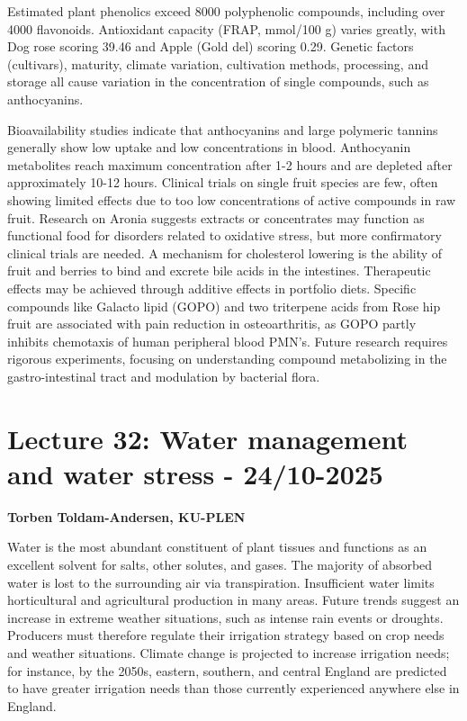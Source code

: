 \vspace{0.5em}
Estimated plant phenolics exceed 8000 polyphenolic compounds, including over 4000 flavonoids. Antioxidant capacity (FRAP, mmol/100 g) varies greatly, with Dog rose scoring 39.46 and Apple (Gold del) scoring 0.29. Genetic factors (cultivars), maturity, climate variation, cultivation methods, processing, and storage all cause variation in the concentration of single compounds, such as anthocyanins.

\vspace{0.5em}
Bioavailability studies indicate that anthocyanins and large polymeric tannins generally show low uptake and low concentrations in blood. Anthocyanin metabolites reach maximum concentration after 1-2 hours and are depleted after approximately 10-12 hours. Clinical trials on single fruit species are few, often showing limited effects due to too low concentrations of active compounds in raw fruit. Research on Aronia suggests extracts or concentrates may function as functional food for disorders related to oxidative stress, but more confirmatory clinical trials are needed. A mechanism for cholesterol lowering is the ability of fruit and berries to bind and excrete bile acids in the intestines. Therapeutic effects may be achieved through additive effects in portfolio diets. Specific compounds like Galacto lipid (GOPO) and two triterpene acids from Rose hip fruit are associated with pain reduction in osteoarthritis, as GOPO partly inhibits chemotaxis of human peripheral blood PMN's. Future research requires rigorous experiments, focusing on understanding compound metabolizing in the gastro-intestinal tract and modulation by bacterial flora.


\section{Lecture 32: Water management and water stress - 24/10-2025}
\textbf{Torben Toldam-Andersen, KU-PLEN}

\vspace{1em}
Water is the most abundant constituent of plant tissues and functions as an excellent solvent for salts, other solutes, and gases. The majority of absorbed water is lost to the surrounding air via transpiration. Insufficient water limits horticultural and agricultural production in many areas. Future trends suggest an increase in extreme weather situations, such as intense rain events or droughts. Producers must therefore regulate their irrigation strategy based on crop needs and weather situations. Climate change is projected to increase irrigation needs; for instance, by the 2050s, eastern, southern, and central England are predicted to have greater irrigation needs than those currently experienced anywhere else in England.

